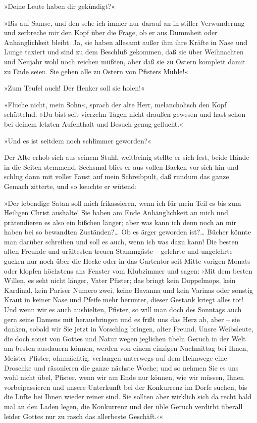 »Deine Leute haben dir gekündigt?«

»Bis auf Samse, und den sehe ich immer nur darauf an in stiller
Verwunderung und zerbreche mir den Kopf über die Frage, ob er aus
Dummheit oder Anhänglichkeit bleibt. Ja, sie haben allesamt außer
ihm ihre Kräfte in Nase und Lunge taxiert und sind zu dem Beschluß
gekommen, daß sie über Weihnachten und Neujahr wohl noch reichen
müßten, aber daß sie zu Ostern komplett damit zu Ende seien. Sie
gehen alle zu Ostern von Pfisters Mühle!«

»Zum Teufel auch! Der Henker soll sie holen!«

»Fluche nicht, mein Sohn«, sprach der alte Herr, melancholisch den
Kopf schüttelnd. »Du bist seit vierzehn Tagen nicht draußen gewesen
und hast schon bei deinem letzten Aufenthalt und Besuch genug
geflucht.«

»Und es ist seitdem noch schlimmer geworden?«

Der Alte erhob sich aus seinem Stuhl, weitbeinig stellte er sich
fest, beide Hände in die Seiten stemmend. Sechsmal blies er aus
vollen Backen vor sich hin und schlug dann mit voller Faust auf
mein Schreibpult, daß rundum das ganze Gemach zitterte, und so
keuchte er wütend:

»Der lebendige Satan soll mich frikassieren, wenn ich für mein Teil
es bis zum Heiligen Christ aushalte! Sie haben am Ende
Anhänglichkeit an mich und prätendieren es also ein bißchen länger;
aber was kann ich denn noch an mir haben bei so bewandten
Zuständen?\ldots{} Ob es ärger geworden ist?\ldots{} Bücher könnte man
darüber schreiben und soll es auch, wenn ich was dazu kann! Die
besten alten Freunde und urältesten treuen Stammgäste – gelehrte
und ungelehrte – gucken nur noch über die Hecke oder in das
Gartentor seit Mitte vorigen Monats oder klopfen höchstens ans
Fenster vom Klubzimmer und sagen: ›Mit dem besten Willen, es seht
nicht länger, Vater Pfister; das bringt kein Doppelmops, kein
Kardinal, kein Pariser Numero zwei, keine Havanna und kein Varinas
oder sonstig Kraut in keiner Nase und Pfeife mehr herunter, dieser
Gestank kriegt alles tot! Und wenn wir es auch aushielten, Pfister,
so will man doch des Sonntags auch gern seine Damens mit
herausbringen und es frißt uns das Herz ab, aber – sie danken,
sobald wir Sie jetzt in Vorschlag bringen, alter Freund. Unsre
Weibsleute, die doch sonst von Gottes und Natur wegen jeglichen
übeln Geruch in der Welt am besten ausdauern können, werden von
einem einzigen Nachmittag bei Ihnen, Meister Pfister, ohnmächtig,
verlangen unterwegs auf dem Heimwege eine Droschke und räsonieren
die ganze nächste Woche; und so nehmen Sie es uns wohl nicht übel,
Pfister, wenn wir am Ende nur können, wie wir müssen, Ihnen
vorbeipassieren und unsere Unterkunft bei der Konkurrenz im Dorfe
suchen, bis die Lüfte bei Ihnen wieder reiner sind. Sie sollten
aber wirklich sich da recht bald mal an den Laden legen, die
Konkurrenz und der üble Geruch verdirbt überall leider Gottes nur
zu rasch das allerbeste Geschäft.‹«

